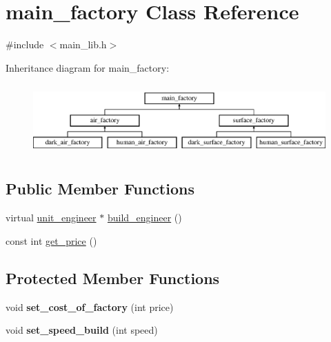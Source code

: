 \hypertarget{classmain__factory}{}\section{main\+\_\+factory Class Reference}
\label{classmain__factory}


{\ttfamily \#include $<$main\+\_\+lib.\+h$>$}

Inheritance diagram for main\+\_\+factory\+:\begin{figure}[H]
\begin{center}
\leavevmode
\includegraphics[height=2.727273cm]{classmain__factory}
\end{center}
\end{figure}
\subsection*{Public Member Functions}
\begin{DoxyCompactItemize}
\item 
virtual \mbox{\hyperlink{classunit__engineer}{unit\+\_\+engineer}} $\ast$ \mbox{\hyperlink{classmain__factory_ac970fe346638331722123f2bb240b590}{build\+\_\+engineer}} ()
\item 
const int \mbox{\hyperlink{classmain__factory_a91e3f57878aaa7b52d9ae4bcfbd84271}{get\+\_\+price}} ()
\end{DoxyCompactItemize}
\subsection*{Protected Member Functions}
\begin{DoxyCompactItemize}
\item 
\mbox{\label{classmain__factory_ac392502ca0be0e5f42f714c4895a909e}} 
void {\bfseries set\+\_\+cost\+\_\+of\+\_\+factory} (int price)
\item 
\mbox{\label{classmain__factory_a6f4ca8fd028cf672a67f7d4bba838cac}} 
void {\bfseries set\+\_\+speed\+\_\+build} (int speed)
\end{DoxyCompactItemize}
